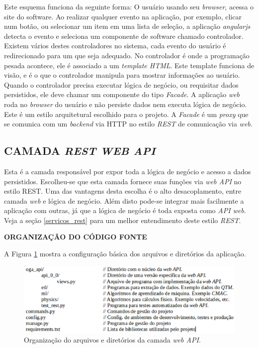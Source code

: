 Este esquema funciona da seguinte forma: O usuário usando seu \emph{browser}, acessa o site do software. 
Ao realizar qualquer evento na aplicação, por exemplo, clicar num botão, ou selecionar um item em uma lista de seleção, a aplicação \emph{angularjs} detecta o evento e seleciona um componente de software chamado controlador. 
Existem vários destes controladores no sistema, cada evento do usuário é redirecionado para um que seja adequado.
No controlador é onde a programação pesada acontece, ele é associado a um \emph{template HTML}. 
Este template funciona de visão, e é o que o controlador manipula para mostrar informações ao usuário.
Quando o controlador precisa executar lógica de negócio, ou requisitar dados persistidos, ele deve chamar um componente do tipo \emph{Facade}. 
A aplicação \emph{web} roda no \emph{browser} do usuário e não persiste dados nem executa lógica de negócio. 
Este é um estilo arquitetural escolhido para o projeto.
A \emph{Facade} é um \emph{proxy} que se comunica com um \emph{backend} via HTTP no estilo \emph{REST} de comunicação via \emph{web}.


\subsection{CAMADA \emph{REST WEB API}}

Esta é a camada responsável por expor toda a lógica de negócio e acesso a dados persistidos. Escolheu-se que esta camada fornece suas funções via \emph{web API} no estilo REST.
Uma das vantagens desta escolha é o alto desacoplamento, entre camada \emph{web} e lógica de negócio. 
Além disto pode-se integrar mais facilmente a aplicação com outras, já que a lógica de negócio é toda exposta como \emph{API web}. 
Veja a seção \ref{servicos_rest} para um melhor entendimento deste estilo \emph{REST}.

\textbf{ORGANIZAÇÃO DO CÓDIGO FONTE}

A Figura \ref{dir_api} mostra a configuração básica dos arquivos e diretórios da aplicação.

\begin{figure}[ht]
	\centering
	\includegraphics[width=15cm]{figuras/dir_api.eps}
	\caption{Organização do arquivos e diretórios da camada \emph{web API}.}
	\label{dir_api}
\end{figure}

